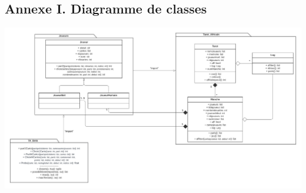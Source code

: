 \begin{landscape}
   \section*{Annexe I. Diagramme de classes}
   \begin{center}
      \includegraphics[scale=.68]{imgs/classDiagram v3}
   \end{center}

\end{landscape}